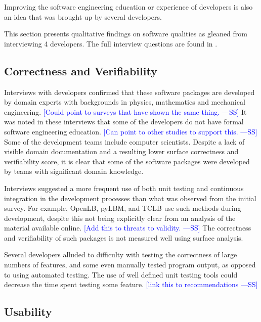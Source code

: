 \documentclass[final, 3p, times, authoryear]{elsarticle}
\newcommand{\authornote}[3]{\textcolor{#1}{[#3 ---#2]}}
\newcommand{\authornote}[3]{}
\newcommand{\wss}[1]{\authornote{blue}{SS}{#1}} %
\begin{document}
Improving the software engineering education or experience of developers is also
an idea that was brought up by several developers.

This section presents qualitative findings on software qualities as gleaned from
interviewing 4 developers. The full interview questions are found in
\citet{SmithEtAl2021}.

\subsection{Correctness and Verifiability}

Interviews with developers confirmed that these software packages are developed
by domain experts with backgrounds in physics, mathematics and mechanical
engineering. \wss{Could point to surveys that have shown the same thing.}  It
was noted in these interviews that some of the developers do not have formal
software engineering education. \wss{Can point to other studies to support
this.} Some of the development teams include computer scientists. Despite a lack
of visible domain documentation and a resulting lower surface correctness and
verifiability score, it is clear that some of the software packages were
developed by teams with significant domain knowledge. 

Interviews suggested a more frequent use of both unit testing and continuous
integration in the development processes than what was observed from the initial
survey. For example, OpenLB, pyLBM, and TCLB use such methods during development,
despite this not being explicitly clear from an analysis of the material
available online. \wss{Add this to threats to validity.}  The correctness and
verifiability of such packages is not measured well using surface analysis.

Several developers alluded to difficulty with testing the correctness of large
numbers of features, and some even manually tested program output, as opposed to
using automated testing. The use of well defined unit testing tools could
decrease the time spent testing some feature.  \wss{link this to
recommendations}

\subsection{Usability}
\end{document}
